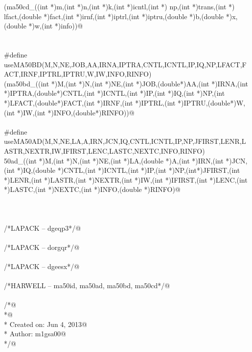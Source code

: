 \documentclass[12pt]{article}
\begin{document}
\begin{flushleft}
\begin{minipage}{\linewidth}
\begin{list}{}{}
\mbox{}\verb@(ma50cd_((int *)m,(int *)n,(int *)k,(int *)icntl,(int *) np,(int *)trans,(int *) lfact,(double *)fact,(int *)irnf,(int *)iptrl,(int *)iptru,(double *)b,(double *)x,(double *)w,(int *)info))@\\
\mbox{}\verb@@\\
\mbox{}\verb@@\\
\mbox{}\verb@#define useMA50BD(M,N,NE,JOB,AA,IRNA,IPTRA,CNTL,ICNTL,IP,IQ,NP,LFACT,FACT,IRNF,IPTRL,IPTRU,W,IW,INFO,RINFO)\@\\
\mbox{}\verb@(ma50bd_((int *)M,(int *)N,(int *)NE,(int *)JOB,(double*)AA,(int *)IRNA,(int *)IPTRA,(double*)CNTL,(int *)ICNTL,(int *)IP,(int *)IQ,(int *)NP,(int *)LFACT,(double*)FACT,(int *)IRNF,(int *)IPTRL,(int *)IPTRU,(double*)W,(int *)IW,(int *)INFO,(double*)RINFO))@\\
\mbox{}\verb@@\\
\mbox{}\verb@#define useMA50AD(M,N,NE,LA,A,IRN,JCN,IQ,CNTL,ICNTL,IP,NP,JFIRST,LENR,LASTR,NEXTR,IW,IFIRST,LENC,LASTC,NEXTC,INFO,RINFO)\@\\
\mbox{}\verb@ma50ad_((int *)M,(int *)N,(int *)NE,(int *)LA,(double *)A,(int *)IRN,(int *)JCN,(int *)IQ,(double *)CNTL,(int *)ICNTL,(int *)IP,(int *)NP,(int*)JFIRST,(int *)LENR,(int *)LASTR,(int *)NEXTR,(int *)IW,(int *)IFIRST,(int *)LENC,(int *)LASTC,(int *)NEXTC,(int *)INFO,(double *)RINFO)@\\
\mbox{}\verb@@\\
\mbox{}\verb@@\\
\mbox{}\verb@@\\
\mbox{}\verb@/*LAPACK -- dgeqp3*/@\\
\mbox{}\verb@@\\
\mbox{}\verb@/*LAPACK -- dorgqr*/@\\
\mbox{}\verb@@\\
\mbox{}\verb@/*LAPACK -- dgeesx*/@\\
\mbox{}\verb@@\\
\mbox{}\verb@/*HARWELL -- ma50id, ma50ad, ma50bd, ma50cd*/@\\
\mbox{}\verb@@\\
\mbox{}\verb@/*@\\
\mbox{}\verb@ *@\\
\mbox{}\verb@ *  Created on: Jun 4, 2013@\\
\mbox{}\verb@ *      Author: m1gsa00@\\
\mbox{}\verb@ */@\\
\mbox{}\verb@@\\
\mbox{}\verb@@\\
\mbox{}\verb@@\\
\mbox{}\verb@@\\
\mbox{}\verb@@\\
\mbox{}\verb@@\\
\mbox{}\verb@@{\NWsep}
\end{list}
\vspace{-1.5ex}
\footnotesize
\begin{list}{}{\setlength{\itemsep}{-\parsep}\setlength{\itemindent}{-\leftmargin}}


\end{list}
\end{minipage}
\end{flushleft}
\end{document}
